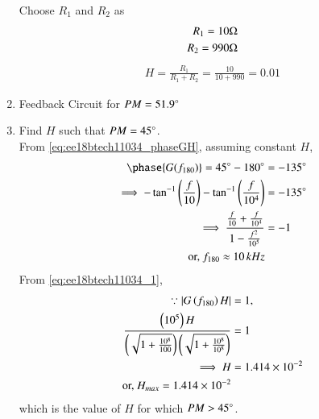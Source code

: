 \begin{enumerate}[label=\arabic*.,ref=\theenumi]
Choose $R_{1}$ and $R_{2}$ as
\begin{align}
    R_{1} = 10\ohm\\
    R_{2} = 990\ohm
\end{align}
\begin{align}
H = \frac{R_{1}}{R_{1}+R_{2}} = \frac{10}{10+990} = 0.01
\end{align}
\item Feedback Circuit for $PM = 51.9\degree$
\\
\solution
\begin{figure}[ht!]
	\begin{center}
		\resizebox{\columnwidth}{!}{}
	\end{center}
	\caption{}
	\label{fig:ee18btech11034_figc}
\end{figure}

%
\item Find $H$ such that $PM = 45\degree$.
\\
\solution From \eqref{eq:ee18btech11034_phaseGH},
assuming constant $H$,
\begin{align}
\phase{G(f_{180})} = 45\degree - 180 \degree &=  -135\degree
\\
\implies -\tan^{-1}\brak{\frac{f}{10}} -\tan^{-1}\brak{\frac{f}{10^{4}}}  &= -135\degree
\\
\implies     \frac{\frac{f}{10} + \frac{f}{10^{4}}}{1-\frac{f^2}{10^{5}}} &= -1
\\
\text{or, }    f_{180} \approx 10 \, kHz
\end{align}
From \eqref{eq:ee18btech11034_1},
\begin{align}
\because  \left\vert G\left(f_{180}\right)H\right\vert&=1,
\\
  \frac{\left(10^{5}\right)H}{\left(\sqrt{1+\frac{10^{8}}{100}}\right)\left(\sqrt{1+\frac{10^{8}}{10^{8}}}\right)} &= 1
\\
\implies     H &= 1.414 \times 10^{-2}
    \\
  \text{or, }  H_{max} =  1.414 \times 10^{-2}
\end{align}
which is the value of $H$ for which $PM > 45\degree$.


\end{enumerate}
